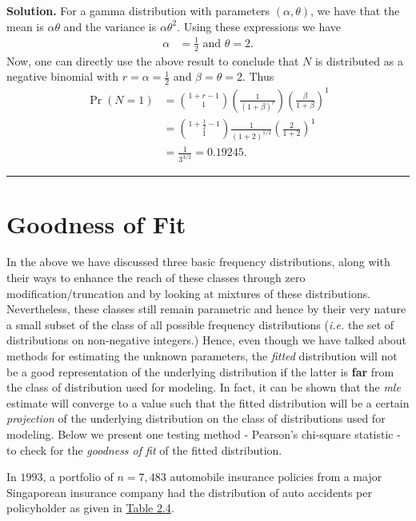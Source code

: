 \documentclass[]{book}
\theoremstyle{definition}
\theoremstyle{definition}
\theoremstyle{definition}
\theoremstyle{remark}
\begin{document}
\hypertarget{toggleExampleFreq.6.2}{}
\textbf{Solution.} For a gamma distribution with parameters
\((\alpha, \theta)\), we have that the mean is \(\alpha \theta\) and the
variance is \(\alpha \theta^2\). Using these expressions we have \[
\begin{aligned}
\alpha &= \frac{1}{2} \text{   and   } \theta =2.
\end{aligned}
\] Now, one can directly use the above result to conclude that \(N\) is
distributed as a negative binomial with \(r = \alpha = \frac{1}{2}\) and
\(\beta= \theta =2\). Thus \[
\begin{aligned}
\Pr(N=1)  &= \binom{1+r-1}{1}(\frac{1}{(1+\beta)^r})\left(\frac{\beta}{1+\beta}\right)^1 \\
&=                 \binom{1+\frac{1}{2}-1}{1}{\frac{1}{(1+2)^{1/2}}}\left(\frac{2}{1+2}\right)^1\\
&=  \frac{1}{3^{3/2}} = 0.19245 .
\end{aligned}
\]

\begin{center}\rule{0.5\linewidth}{\linethickness}\end{center}

\section{Goodness of Fit}\label{S:goodness-of-fit}

In the above we have discussed three basic frequency distributions,
along with their ways to enhance the reach of these classes through zero
modification/truncation and by looking at mixtures of these
distributions. Nevertheless, these classes still remain parametric and
hence by their very nature a small subset of the class of all possible
frequency distributions (\emph{i.e.} the set of distributions on
non-negative integers.) Hence, even though we have talked about methods
for estimating the unknown parameters, the \emph{fitted} distribution
will not be a good representation of the underlying distribution if the
latter is \textbf{far} from the class of distribution used for modeling.
In fact, it can be shown that the \emph{mle} estimate will converge to a
value such that the fitted distribution will be a certain
\emph{projection} of the underlying distribution on the class of
distributions used for modeling. Below we present one testing method -
Pearson's chi-square statistic - to check for the \emph{goodness of fit}
of the fitted distribution.

In \(1993\), a portfolio of \(n=7,483\) automobile insurance policies
from a major Singaporean insurance company had the distribution of auto
accidents per policyholder as given in \protect\hyperlink{tab:2.4}{Table
2.4}.
\end{document}

